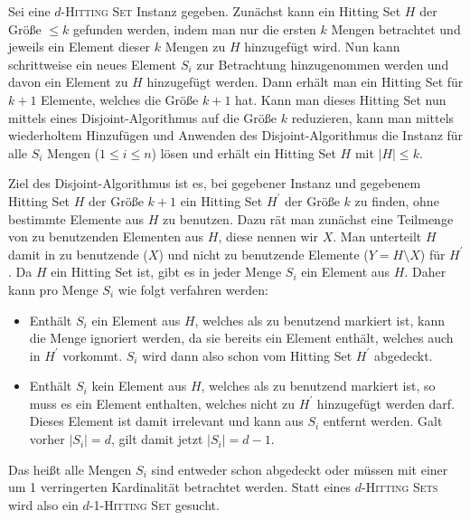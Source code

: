 

\DeclareMathOperator{\vc}{vc}




Sei eine $d$-\textsc{Hitting Set} Instanz gegeben. Zunächst kann ein Hitting Set $H$ der Größe $\leq k$ gefunden werden, indem man nur die ersten $k$ Mengen betrachtet und jeweils ein Element dieser $k$ Mengen zu $H$ hinzugefügt wird. Nun kann schrittweise ein neues Element $S_i$ zur Betrachtung hinzugenommen werden und davon ein Element zu $H$ hinzugefügt werden. Dann erhält man ein Hitting Set für $k+1$ Elemente, welches die Größe $k+1$ hat. Kann man dieses Hitting Set nun mittels eines Disjoint-Algorithmus auf die Größe $k$ reduzieren, kann man mittels wiederholtem Hinzufügen und Anwenden des Disjoint-Algorithmus die Instanz für alle $S_i$ Mengen ($1 \leq i \leq n$) lösen und erhält ein Hitting Set $H$ mit $|H| \leq k$.

Ziel des Disjoint-Algorithmus ist es, bei gegebener Instanz und gegebenem Hitting Set $H$ der Größe $k+1$ ein Hitting Set $H^\prime$ der Größe $k$ zu finden, ohne bestimmte Elemente aus $H$ zu benutzen. Dazu rät man zunächst eine Teilmenge von zu benutzenden Elementen aus $H$, diese nennen wir $X$. Man unterteilt $H$ damit in zu benutzende ($X$) und nicht zu benutzende Elemente ($Y = H \setminus X$) für $H^\prime$. Da $H$ ein Hitting Set ist, gibt es in jeder Menge $S_i$ ein Element aus $H$. Daher kann pro Menge $S_i$ wie folgt verfahren werden:

\begin{itemize}
\item Enthält $S_i$ ein Element aus $H$, welches als zu benutzend markiert ist, kann die Menge ignoriert werden, da sie bereits ein Element enthält, welches auch in $H^\prime$ vorkommt. $S_i$ wird dann also schon vom Hitting Set $H^\prime$ abgedeckt.

\item Enthält $S_i$ kein Element aus $H$, welches als zu benutzend markiert ist, so muss es ein Element enthalten, welches nicht zu $H^\prime$ hinzugefügt werden darf. Dieses Element ist damit irrelevant und kann aus $S_i$ entfernt werden. Galt vorher $|S_i| = d$, gilt damit jetzt $|S_i|=d-1$.

\end{itemize}

Das heißt alle Mengen $S_i$ sind entweder schon abgedeckt oder müssen mit einer um 1 verringerten Kardinalität betrachtet werden. Statt eines $d$-\textsc{Hitting Sets} wird also ein $d$-1-\textsc{Hitting Set} gesucht.

